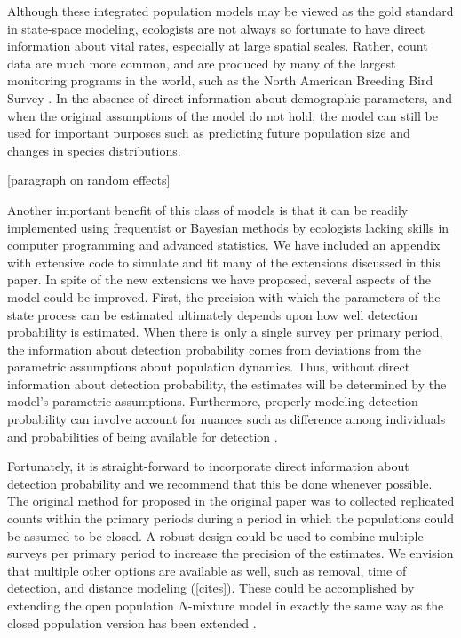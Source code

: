 \documentclass[12pt]{article}
\begin{document}

Although these integrated population models may be viewed as the gold standard in
state-space modeling, ecologists are not always so fortunate to have direct
information about vital rates, especially at large spatial scales.
Rather, count data are much more common, and
are produced by many of the largest monitoring programs in the
world, such as the North American Breeding Bird Survey
\citep[BBS;][]{robbins_etal:1986}.
In the absence of direct information about demographic parameters, and
when the original assumptions of the model do not hold, the
model can still be used for important purposes such as predicting future
population size and changes in species distributions.

[paragraph on random effects]

Another important benefit of this class of models is that it can be
readily implemented using frequentist or Bayesian methods by
ecologists lacking skills in computer programming and advanced
statistics. We have included an appendix with extensive code to
simulate and fit many of the extensions discussed in this paper.
In spite of the new extensions we have proposed, several aspects of
the model could be improved. First, the precision with which the
parameters of the state process can be estimated ultimately depends
upon how well detection probability is estimated. When there is
only a single survey per primary period, the information about
detection probability comes from deviations from the parametric
assumptions about population dynamics. Thus, without direct information
about detection probability, the estimates will be determined by the
model's parametric assumptions. Furthermore, properly modeling detection
probability can involve account for nuances such as difference
among individuals and probabilities of being available for detection
\citep{nichols_etal:2009}.

Fortunately, it is straight-forward to incorporate direct information about
detection probability and we recommend that this be done whenever
possible. The original method for proposed in the original paper
was to collected replicated counts within the primary periods during
a period in which the populations could be assumed to be closed. A
robust design could be used to combine multiple surveys per
primary period to increase the precision of the estimates. We envision
that multiple other options are available as well, such as removal,
time of detection, and distance modeling ([cites]). These could be
accomplished by extending the open population $N$-mixture model
in exactly the same way as the closed population version has been
extended \citep[e.g.,][]{royle_etal:2004}.
\end{document}
